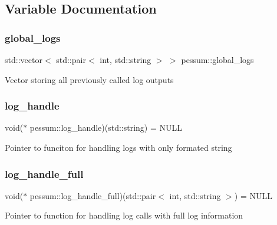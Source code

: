 \subsection{Variable Documentation}
\mbox{\label{namespacepessum_af89cb9c0ecf053bd93b6cfadf606b350}} 
\subsubsection{\texorpdfstring{global\+\_\+logs}{global\_logs}}
{\footnotesize\ttfamily std\+::vector$<$ std\+::pair$<$ int, std\+::string $>$ $>$ pessum\+::global\+\_\+logs}

Vector storing all previously called log outputs \mbox{\label{namespacepessum_af96bc8aacecc5a8145c0df704b5f9b54}} 
\subsubsection{\texorpdfstring{log\+\_\+handle}{log\_handle}}
{\footnotesize\ttfamily void($\ast$ pessum\+::log\+\_\+handle)(std\+::string) = N\+U\+LL}

Pointer to funciton for handling logs with only formated string \mbox{\label{namespacepessum_abf1b472e1b61a337c584d96eb9789f8e}} 
\subsubsection{\texorpdfstring{log\+\_\+handle\+\_\+full}{log\_handle\_full}}
{\footnotesize\ttfamily void($\ast$ pessum\+::log\+\_\+handle\+\_\+full)(std\+::pair$<$ int, std\+::string $>$) = N\+U\+LL}

Pointer to function for handling log calls with full log information 